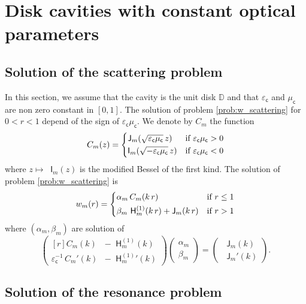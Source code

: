 \documentclass[12pt,a4paper]{article}
\newcommand{\bbD}{\mathbb{D}}
\newcommand{\bJ}{\mathop{}\!\mathsf{J}}
\newcommand{\Hu}{\mathop{}\!\mathsf{H}^{(1)}}
\newcommand{\bI}{\mathop{}\!\mathsf{I}}
\newcommand{\ecav}{\varepsilon_\mathsf{c}}
\newcommand{\mcav}{\mu_\mathsf{c}}
\begin{document}
\section{Disk cavities with constant optical parameters}

\subsection{Solution of the scattering problem}

In this section, we assume that the cavity is the unit disk $\bbD$ and that $\ecav$ and $\mcav$ are non zero constant in $[0, 1]$.
The solution of problem \eqref{prob:w_scattering} for $0 < r < 1$ depend of the sign of $\ecav\mcav$.
We denote by $C_m$ the function
\[
    C_m(z) = \begin{dcases}
        \bJ_m(\sqrt{\ecav\mcav}\, z) & \text{if } \ecav\mcav > 0\\
        \bI_m(\sqrt{-\ecav\mcav}\, z) & \text{if } \ecav\mcav < 0
    \end{dcases}
\]
where $z \mapsto \bI_m(z)$ is the modified Bessel of the first kind.
The solution of problem \eqref{prob:w_scattering} is
\begin{equation}
    w_m(r) = \begin{dcases}
        \alpha_m\, C_m(k\, r) & \text{if } r \le 1\\
        \beta_m\, \Hu_m(k\, r) + \bJ_m(k\, r) & \text{if } r > 1
    \end{dcases}
\end{equation}
where $(\alpha_m, \beta_m)$ are solution of
\begin{equation}
    \begin{pmatrix*}[r]
        C_m(k) & -\Hu_m(k)\\[1ex]
        \ecav^{-1}\, C_m'(k) & -{\Hu_m}'(k)
    \end{pmatrix*}
    \begin{pmatrix}
        \alpha_m\\[1ex]
        \beta_m
    \end{pmatrix} = 
    \begin{pmatrix}
        \bJ_m(k)\\[1ex]
        \bJ_m'(k)
    \end{pmatrix}.
\end{equation}

\subsection{Solution of the resonance problem}
\end{document}

